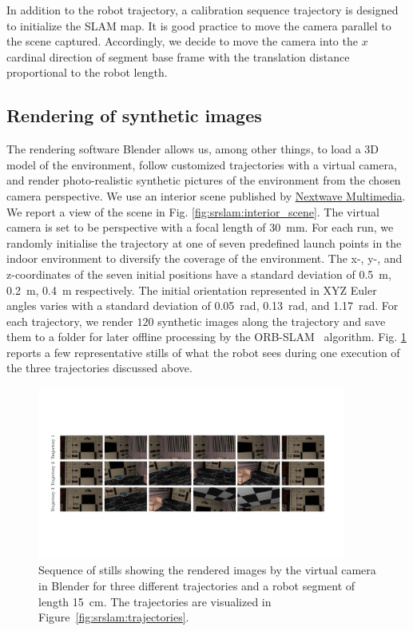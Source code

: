 In addition to the robot trajectory, a calibration sequence trajectory is designed to initialize the \gls{SLAM} map. 
It is good practice to move the camera parallel to the scene captured. Accordingly, we decide to move the camera into the $x$ cardinal direction of segment base frame with the translation distance proportional to the robot length.

\subsection{Rendering of synthetic images}
The rendering software Blender allows us, among other things, to load a 3D model of the environment, follow customized trajectories with a virtual camera, and render photo-realistic synthetic pictures of the environment from the chosen camera perspective. We use an interior scene published by \href{https://www.nextwavemultimedia.com/html/3dblendermodel.html}{Nextwave Multimedia}. We report a view of the scene in Fig. \ref{fig:srslam:interior_scene}.
The virtual camera is set to be perspective with a focal length of \SI{30}{mm}.
For each run, we randomly initialise the trajectory at one of seven predefined launch points in the indoor environment to diversify the coverage of the environment.
The x-, y-, and z-coordinates of the seven initial positions have a standard deviation of \SI{0.5}{m}, \SI{0.2}{m}, \SI{0.4}{m} respectively. The initial orientation represented in XYZ Euler angles varies with a standard deviation of \SI{0.05}{rad}, \SI{0.13}{rad}, and \SI{1.17}{rad}.
For each trajectory, we render $120$ synthetic images along the trajectory and save them to a folder for later offline processing by the ORB-SLAM~\cite{mur2017orb} algorithm. Fig. \ref{fig:srslam:sequences_of_stills_simulations_cropped} reports a few representative stills of what the robot sees during one execution of the three trajectories discussed above.

\begin{figure}
    \centering
    \includegraphics[width=0.9\textwidth]{srslam/figures/graphic_sequences_of_stills_simulations_compressed.pdf}
    \caption{Sequence of stills showing the rendered images by the virtual camera in Blender for three different trajectories and a robot segment of length \SI{15}{cm}. The trajectories are visualized in Figure~\ref{fig:srslam:trajectories}.}
    \label{fig:srslam:sequences_of_stills_simulations_cropped}
\end{figure}

